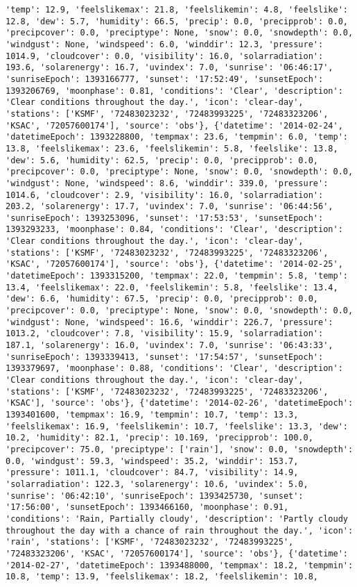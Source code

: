 \documentclass[
  letterpaper,
  DIV=11,
  numbers=noendperiod]{scrartcl}
\begin{document}
\begin{verbatim}
'temp': 12.9, 'feelslikemax': 21.8, 'feelslikemin': 4.8, 'feelslike': 12.8, 'dew': 5.7, 'humidity': 66.5, 'precip': 0.0, 'precipprob': 0.0, 'precipcover': 0.0, 'preciptype': None, 'snow': 0.0, 'snowdepth': 0.0, 'windgust': None, 'windspeed': 6.0, 'winddir': 12.3, 'pressure': 1014.9, 'cloudcover': 0.0, 'visibility': 16.0, 'solarradiation': 193.6, 'solarenergy': 16.7, 'uvindex': 7.0, 'sunrise': '06:46:17', 'sunriseEpoch': 1393166777, 'sunset': '17:52:49', 'sunsetEpoch': 1393206769, 'moonphase': 0.81, 'conditions': 'Clear', 'description': 'Clear conditions throughout the day.', 'icon': 'clear-day', 'stations': ['KSMF', '72483023232', '72483993225', '72483323206', 'KSAC', '72057600174'], 'source': 'obs'}, {'datetime': '2014-02-24', 'datetimeEpoch': 1393228800, 'tempmax': 23.6, 'tempmin': 6.0, 'temp': 13.8, 'feelslikemax': 23.6, 'feelslikemin': 5.8, 'feelslike': 13.8, 'dew': 5.6, 'humidity': 62.5, 'precip': 0.0, 'precipprob': 0.0, 'precipcover': 0.0, 'preciptype': None, 'snow': 0.0, 'snowdepth': 0.0, 'windgust': None, 'windspeed': 8.6, 'winddir': 339.0, 'pressure': 1014.6, 'cloudcover': 2.9, 'visibility': 16.0, 'solarradiation': 203.2, 'solarenergy': 17.7, 'uvindex': 7.0, 'sunrise': '06:44:56', 'sunriseEpoch': 1393253096, 'sunset': '17:53:53', 'sunsetEpoch': 1393293233, 'moonphase': 0.84, 'conditions': 'Clear', 'description': 'Clear conditions throughout the day.', 'icon': 'clear-day', 'stations': ['KSMF', '72483023232', '72483993225', '72483323206', 'KSAC', '72057600174'], 'source': 'obs'}, {'datetime': '2014-02-25', 'datetimeEpoch': 1393315200, 'tempmax': 22.0, 'tempmin': 5.8, 'temp': 13.4, 'feelslikemax': 22.0, 'feelslikemin': 5.8, 'feelslike': 13.4, 'dew': 6.6, 'humidity': 67.5, 'precip': 0.0, 'precipprob': 0.0, 'precipcover': 0.0, 'preciptype': None, 'snow': 0.0, 'snowdepth': 0.0, 'windgust': None, 'windspeed': 16.6, 'winddir': 226.7, 'pressure': 1013.2, 'cloudcover': 7.8, 'visibility': 15.9, 'solarradiation': 187.1, 'solarenergy': 16.0, 'uvindex': 7.0, 'sunrise': '06:43:33', 'sunriseEpoch': 1393339413, 'sunset': '17:54:57', 'sunsetEpoch': 1393379697, 'moonphase': 0.88, 'conditions': 'Clear', 'description': 'Clear conditions throughout the day.', 'icon': 'clear-day', 'stations': ['KSMF', '72483023232', '72483993225', '72483323206', 'KSAC'], 'source': 'obs'}, {'datetime': '2014-02-26', 'datetimeEpoch': 1393401600, 'tempmax': 16.9, 'tempmin': 10.7, 'temp': 13.3, 'feelslikemax': 16.9, 'feelslikemin': 10.7, 'feelslike': 13.3, 'dew': 10.2, 'humidity': 82.1, 'precip': 10.169, 'precipprob': 100.0, 'precipcover': 75.0, 'preciptype': ['rain'], 'snow': 0.0, 'snowdepth': 0.0, 'windgust': 59.3, 'windspeed': 35.2, 'winddir': 153.7, 'pressure': 1011.1, 'cloudcover': 84.7, 'visibility': 14.9, 'solarradiation': 122.3, 'solarenergy': 10.6, 'uvindex': 5.0, 'sunrise': '06:42:10', 'sunriseEpoch': 1393425730, 'sunset': '17:56:00', 'sunsetEpoch': 1393466160, 'moonphase': 0.91, 'conditions': 'Rain, Partially cloudy', 'description': 'Partly cloudy throughout the day with a chance of rain throughout the day.', 'icon': 'rain', 'stations': ['KSMF', '72483023232', '72483993225', '72483323206', 'KSAC', '72057600174'], 'source': 'obs'}, {'datetime': '2014-02-27', 'datetimeEpoch': 1393488000, 'tempmax': 18.2, 'tempmin': 10.8, 'temp': 13.9, 'feelslikemax': 18.2, 'feelslikemin': 10.8, 
\end{verbatim}
\end{document}
